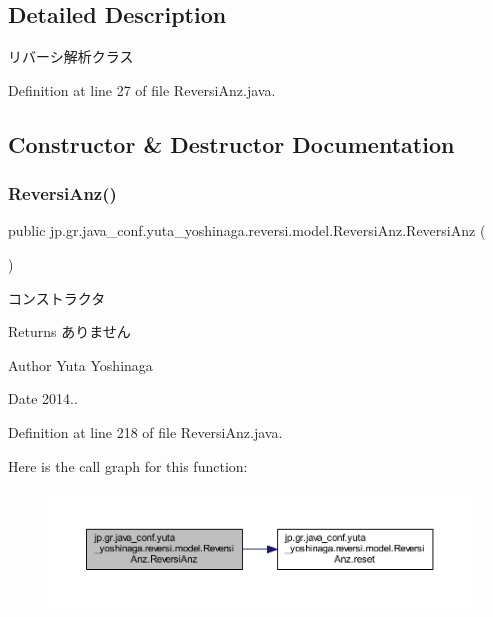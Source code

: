\subsection{Detailed Description}
リバーシ解析クラス 

Definition at line 27 of file Reversi\+Anz.\+java.



\subsection{Constructor \& Destructor Documentation}
\mbox{\label{classjp_1_1gr_1_1java__conf_1_1yuta__yoshinaga_1_1reversi_1_1model_1_1_reversi_anz_a130d4d7b3641a385209d1596c2f3e024}} 
\subsubsection{\texorpdfstring{Reversi\+Anz()}{ReversiAnz()}}
{\footnotesize\ttfamily public jp.\+gr.\+java\+\_\+conf.\+yuta\+\_\+yoshinaga.\+reversi.\+model.\+Reversi\+Anz.\+Reversi\+Anz (\begin{DoxyParamCaption}{ }\end{DoxyParamCaption})}



コンストラクタ 

\begin{DoxyReturn}{Returns}
ありません 
\end{DoxyReturn}
\begin{DoxyAuthor}{Author}
Yuta Yoshinaga 
\end{DoxyAuthor}
\begin{DoxyDate}{Date}
2014.. 
\end{DoxyDate}


Definition at line 218 of file Reversi\+Anz.\+java.

Here is the call graph for this function\+:
\nopagebreak
\begin{figure}[H]
\begin{center}
\leavevmode
\includegraphics[width=350pt]{classjp_1_1gr_1_1java__conf_1_1yuta__yoshinaga_1_1reversi_1_1model_1_1_reversi_anz_a130d4d7b3641a385209d1596c2f3e024_cgraph}
\end{center}
\end{figure}


